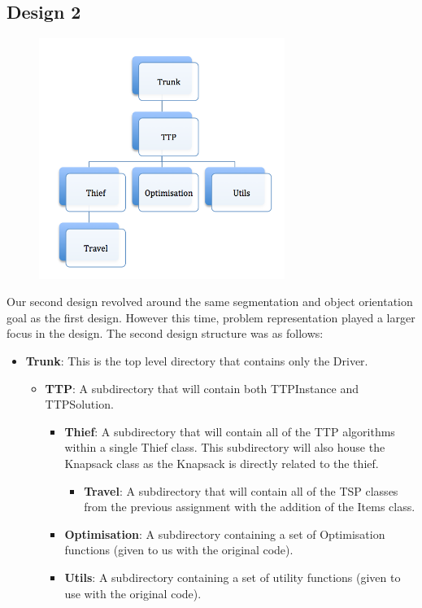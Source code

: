 \documentclass[a4paper,12pt]{article}
\begin{document}
\subsection*{Design 2}
\begin{figure}[h]
\centering
\includegraphics[width=80mm]{design2.png}
\end{figure}

Our second design revolved around the same segmentation and object orientation goal as the first design. However this time, problem representation played a larger focus in the design. The second design structure was as follows:
\begin{itemize}
\item \textbf{Trunk}: This is the top level directory that contains only the Driver.
\begin{itemize}
\item \textbf{TTP}: A subdirectory that will contain both TTPInstance and TTPSolution.
\begin{itemize}
\item \textbf{Thief}: A subdirectory that will contain all of the TTP algorithms within a single Thief class. This subdirectory will also house the Knapsack class as the Knapsack is directly related to the thief.
\begin{itemize}
\item \textbf{Travel}: A subdirectory that will contain all of the TSP classes from the previous assignment with the addition of the Items class.
\end{itemize}
\item \textbf{Optimisation}: A subdirectory containing a set of Optimisation functions (given to us with the original code).
\item \textbf{Utils}: A subdirectory containing a set of utility functions (given to use with the original code).
\end{itemize}
\end{itemize}
\end{itemize}
\end{document}
